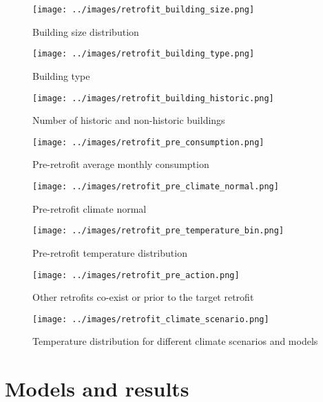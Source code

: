 \documentclass[12pt]{article}
\begin{document}
\begin{figure}[H]
  \centering
  \texttt{[image: ../images/retrofit\_building\_size.png]}
  \caption[Building size]{Building size distribution}
  \label{fig:retrofit_building_size}
\end{figure}
\begin{figure}[H]
  \centering
  \texttt{[image: ../images/retrofit\_building\_type.png]}
  \caption[Building type]{Building type}
  \label{fig:retrofit_building_type}
\end{figure}
\begin{figure}[H]
  \centering
  \texttt{[image: ../images/retrofit\_building\_historic.png]}
  \caption[Historic buildings]{Number of historic and non-historic buildings}
  \label{fig:retrofit_building_historic}
\end{figure}
\begin{figure}[H]
  \centering
  \texttt{[image: ../images/retrofit\_pre\_consumption.png]}
  \caption[Pre-retrofit energy]{Pre-retrofit average monthly consumption}
  \label{fig:retrofit_pre_consumption}
\end{figure}
\begin{figure}[H]
  \centering
  \texttt{[image: ../images/retrofit\_pre\_climate\_normal.png]}
  \caption[Pre-retrofit climate normal]{Pre-retrofit climate normal}
  \label{fig:retrofit_pre_climate_normal}
\end{figure}
\begin{figure}[H]
  \centering
  \texttt{[image: ../images/retrofit\_pre\_temperature\_bin.png]}
  \caption[Pre-retrofit weather]{Pre-retrofit temperature distribution}
  \label{fig:retrofit_pre_temperature_bin}
\end{figure}
\begin{figure}[H]
  \centering
  \texttt{[image: ../images/retrofit\_pre\_action.png]}
  \caption[Pre-retrofit weather]{Other retrofits co-exist or prior to the target
  retrofit}
  \label{fig:retrofit_pre_action}
\end{figure}
\begin{figure}[H]
  \centering
  \texttt{[image: ../images/retrofit\_climate\_scenario.png]}
  \caption[Climate scenario]{Temperature distribution for different climate
    scenarios and models}
  \label{fig:retrofit_climate_scenario}
\end{figure}

\section{Models and results}
\end{document}
